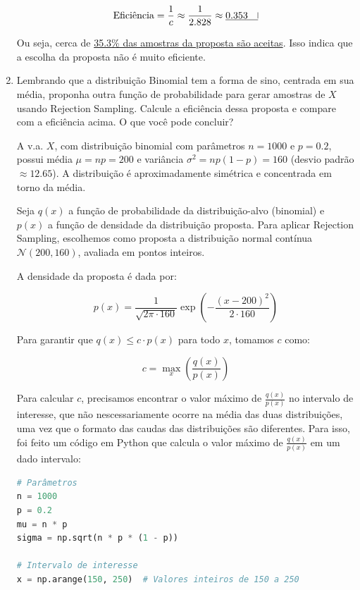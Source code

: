 \documentclass[12 pt]{article}
\begin{document}
\begin{enumerate}
\begin{tcolorbox}[colframe=black, title=Resposta:]
        $$
        \text{Eficiência} = \frac{1}{c} \approx \frac{1}{2.828} \approx \underline{0.353 \quad \vline}
        $$
        
        Ou seja, cerca de \underline{35.3\% das amostras da proposta são aceitas}. Isso indica que a escolha da proposta não é muito eficiente.
        \end{tcolorbox}
    \newpage
    \item Lembrando que a distribuição Binomial tem a forma de sino, centrada em sua média, proponha outra função de probabilidade para gerar amostras de $X$ usando Rejection Sampling. Calcule a eficiência dessa proposta e compare com a eficiência acima. O que você pode concluir?
    \begin{tcolorbox}[colframe=black, title=Resposta:]
        A v.a. $X$, com distribuição binomial com parâmetros $n = 1000$ e $p = 0.2$, possui média $\mu = np = 200$ e variância $\sigma^2 = np(1 - p) = 160$ (desvio padrão $\approx 12.65$). A distribuição é aproximadamente simétrica e concentrada em torno da média.
        
        Seja $q(x)$ a função de probabilidade da distribuição-alvo (binomial) e $p(x)$ a função de densidade da distribuição proposta. Para aplicar Rejection Sampling, escolhemos como proposta a distribuição normal contínua $\mathcal{N}(200, 160)$, avaliada em pontos inteiros.
        
        A densidade da proposta é dada por:
        
        $$
        p(x) = \frac{1}{\sqrt{2\pi \cdot 160}} \exp\left( -\frac{(x - 200)^2}{2 \cdot 160} \right)
        $$
        
        Para garantir que $q(x) \leq c \cdot p(x)$ para todo $x$, tomamos $c$ como:
        
        $$
        c = \max_x \left( \frac{q(x)}{p(x)} \right)
        $$
        
        Para calcular $c$, precisamos encontrar o valor máximo de $\frac{q(x)}{p(x)}$ no intervalo de interesse, que não nescessariamente ocorre na média das duas distribuições, uma vez que o formato das caudas das distribuições são diferentes. Para isso, foi feito um código em Python que calcula o valor máximo de $\frac{q(x)}{p(x)}$ em um dado intervalo:
        \begin{lstlisting}[language=Python]
# Parâmetros
n = 1000
p = 0.2
mu = n * p
sigma = np.sqrt(n * p * (1 - p))

# Intervalo de interesse
x = np.arange(150, 250)  # Valores inteiros de 150 a 250


\end{lstlisting}
\end{tcolorbox}
\end{enumerate}
\end{document}
